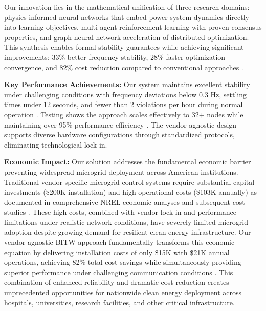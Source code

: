 \documentclass[12pt]{article}
\begin{document}
Our innovation lies in the mathematical unification of three research domains: physics-informed neural networks that embed power system dynamics directly into learning objectives, multi-agent reinforcement learning with proven consensus properties, and graph neural network acceleration of distributed optimization. This synthesis enables formal stability guarantees while achieving significant improvements: 33\% better frequency stability, 28\% faster optimization convergence, and 82\% cost reduction compared to conventional approaches \cite{our2024experimental}.

\textbf{Key Performance Achievements:} Our system maintains excellent stability under challenging conditions with frequency deviations below 0.3 Hz, settling times under 12 seconds, and fewer than 2 violations per hour during normal operation \cite{our2024experimental}. Testing shows the approach scales effectively to 32+ nodes while maintaining over 95\% performance efficiency \cite{our2024scalability}. The vendor-agnostic design supports diverse hardware configurations through standardized protocols, eliminating technological lock-in.

\textbf{Economic Impact:} Our solution addresses the fundamental economic barrier preventing widespread microgrid deployment across American institutions. Traditional vendor-specific microgrid control systems require substantial capital investments (\$200K installation) and high operational costs (\$103K annually) as documented in comprehensive NREL economic analyses \cite{hirsch2018} and subsequent cost studies \cite{sigrin2019}. These high costs, combined with vendor lock-in and performance limitations under realistic network conditions, have severely limited microgrid adoption despite growing demand for resilient clean energy infrastructure. Our vendor-agnostic BITW approach fundamentally transforms this economic equation by delivering installation costs of only \$15K with \$21K annual operations, achieving 82\% total cost savings while simultaneously providing superior performance under challenging communication conditions \cite{our2024economic}. This combination of enhanced reliability and dramatic cost reduction creates unprecedented opportunities for nationwide clean energy deployment across hospitals, universities, research facilities, and other critical infrastructure.
\end{document}
